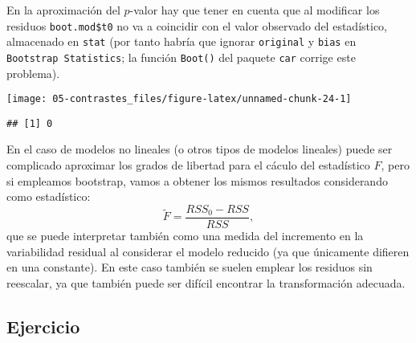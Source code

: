 \documentclass[
]{book}
\newenvironment{Shaded}{\begin{snugshade}}{\end{snugshade}}
\newcommand{\DataTypeTok}[1]{\textcolor[rgb]{0.13,0.29,0.53}{#1}}
\newcommand{\DecValTok}[1]{\textcolor[rgb]{0.00,0.00,0.81}{#1}}
\newcommand{\KeywordTok}[1]{\textcolor[rgb]{0.13,0.29,0.53}{\textbf{#1}}}
\newcommand{\NormalTok}[1]{#1}
\newcommand{\OperatorTok}[1]{\textcolor[rgb]{0.81,0.36,0.00}{\textbf{#1}}}
\newcommand{\OtherTok}[1]{\textcolor[rgb]{0.56,0.35,0.01}{#1}}
\newcommand{\StringTok}[1]{\textcolor[rgb]{0.31,0.60,0.02}{#1}}
\theoremstyle{break}
\theoremstyle{definition}
\theoremstyle{definition}
\theoremstyle{definition}
\theoremstyle{remark}
\begin{document}
En la aproximación del \(p\)-valor hay que tener en cuenta que al modificar los residuos
\texttt{boot.mod\$t0} no va a coincidir con el valor observado del estadístico,
almacenado en \texttt{stat} (por tanto habría que ignorar \texttt{original} y \texttt{bias}
en \texttt{Bootstrap\ Statistics};
la función \texttt{Boot()} del paquete \texttt{car} corrige este problema).

\begin{Shaded}
\end{Shaded}

\begin{center}\texttt{[image: 05-contrastes\_files/figure-latex/unnamed-chunk-24-1]} \end{center}

\begin{Shaded}
\end{Shaded}

\begin{verbatim}
## [1] 0
\end{verbatim}

En el caso de modelos no lineales (o otros tipos de modelos lineales) puede ser
complicado aproximar los grados de libertad para el cáculo del estadístico \(F\),
pero si empleamos bootstrap, vamos a obtener los mismos resultados considerando
como estadístico:
\[\tilde F =\frac{RSS_0 - RSS}{RSS},\]
que se puede interpretar también como una medida del incremento en la variabilidad residual
al considerar el modelo reducido (ya que únicamente difieren en una constante).
En este caso también se suelen emplear los residuos sin reescalar, ya que también puede ser
difícil encontrar la transformación adecuada.

\hypertarget{ejercicio}{%
\subsection{Ejercicio}\label{ejercicio}}
\end{document}

